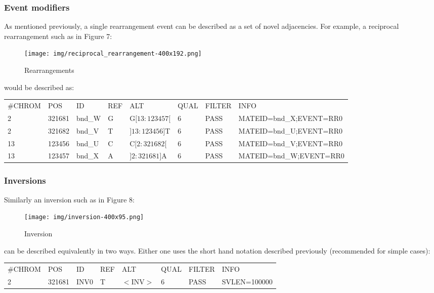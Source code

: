 \documentclass[8pt]{article}
\begin{document}
\subsubsection{Event modifiers}
As mentioned previously, a single rearrangement event can be described as a set of novel adjacencies.
For example, a reciprocal rearrangement such as in Figure 7:

\begin{figure}[ht]
\centering
\texttt{[image: img/reciprocal\_rearrangement-400x192.png]}
\caption{Rearrangements}
\end{figure}

\noindent
would be described as:

\vspace{0.3cm}
\footnotesize
\begin{tabular}{ l l l l l l l l }
\#CHROM & POS & ID & REF & ALT & QUAL & FILTER & INFO \\
2 & 321681 & bnd\_W & G & G$[13:123457[$ & 6 & PASS & MATEID=bnd\_X;EVENT=RR0 \\
2 & 321682 & bnd\_V & T & $]13:123456]$T & 6 & PASS & MATEID=bnd\_U;EVENT=RR0 \\
13 & 123456 & bnd\_U & C & C$[2:321682[$ & 6 & PASS & MATEID=bnd\_V;EVENT=RR0 \\
13 & 123457 & bnd\_X & A & $]2:321681]$A & 6 & PASS & MATEID=bnd\_W;EVENT=RR0 \\
\end{tabular}
\normalsize

\subsubsection{Inversions}
\begin{samepage}
Similarly an inversion such as in Figure 8:

\begin{figure}[ht]
\centering
\texttt{[image: img/inversion-400x95.png]}
\caption{Inversion}
\end{figure}

\noindent
can be described equivalently in two ways.
Either one uses the short hand notation described previously (recommended for simple cases):
\end{samepage}

\vspace{0.3cm}
\small
\begin{tabular}{ l l l l l l l l }
\#CHROM & POS & ID & REF & ALT & QUAL & FILTER & INFO \\
2 & 321681 & INV0 & T & $<$INV$>$ & 6 & PASS & SVLEN=100000 \\
\end{tabular}
\normalsize
\vspace{0.3cm}
\end{document}
